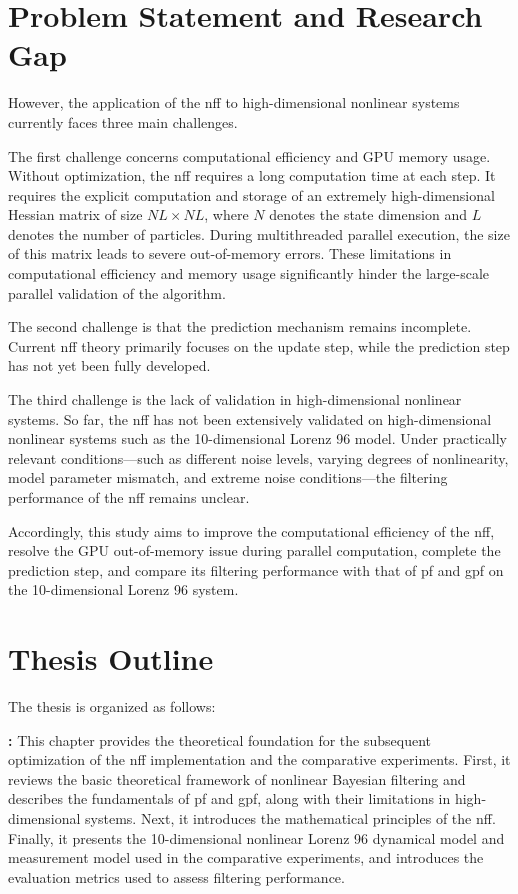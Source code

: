 \section{Problem Statement and Research Gap}

However, the application of the \ac{nff} to high-dimensional nonlinear systems currently faces three main challenges.

The first challenge concerns computational efficiency and GPU memory usage. Without optimization, the \ac{nff} requires a long computation time at each step. It requires the explicit computation and storage of an extremely high-dimensional Hessian matrix of size $NL \times NL$, where $N$ denotes the state dimension and $L$ denotes the number of particles. During multithreaded parallel execution, the size of this matrix leads to severe out-of-memory errors. These limitations in computational efficiency and memory usage significantly hinder the large-scale parallel validation of the algorithm.

The second challenge is that the prediction mechanism remains incomplete. Current \ac{nff} theory primarily focuses on the update step, while the prediction step has not yet been fully developed.

The third challenge is the lack of validation in high-dimensional nonlinear systems. So far, the \ac{nff} has not been extensively validated on high-dimensional nonlinear systems such as the 10-dimensional Lorenz 96 model. Under practically relevant conditions—such as different noise levels, varying degrees of nonlinearity, model parameter mismatch, and extreme noise conditions—the filtering performance of the \ac{nff} remains unclear.

Accordingly, this study aims to improve the computational efficiency of the \ac{nff}, resolve the GPU out-of-memory issue during parallel computation, complete the prediction step, and compare its filtering performance with that of \ac{pf} and \ac{gpf} on the 10-dimensional Lorenz 96 system.

\clearpage

\section{Thesis Outline}
The thesis is organized as follows:

\textbf{: } This chapter provides the theoretical foundation for the subsequent optimization of the \ac{nff} implementation and the comparative experiments. First, it reviews the basic theoretical framework of nonlinear Bayesian filtering and describes the fundamentals of \ac{pf} and \ac{gpf}, along with their limitations in high-dimensional systems. Next, it introduces the mathematical principles of the \ac{nff}. Finally, it presents the 10-dimensional nonlinear Lorenz 96 dynamical model and measurement model used in the comparative experiments, and introduces the evaluation metrics used to assess filtering performance.

